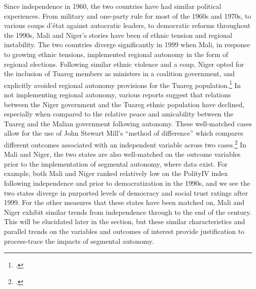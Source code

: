\documentclass[12pt]{article}
\begin{document}
Since independence in 1960, the two countries have had similar political experiences. From military and one-party rule for most of the 1960s and 1970s, to various coups d’état against autocratic leaders, to democratic reforms throughout the 1990s, Mali and Niger's stories have been of ethnic tension and regional instability. The two countries diverge significantly in 1999 when Mali, in response to growing ethnic tensions, implemented regional autonomy in the form of regional elections. Following similar ethnic violence and a coup, Niger opted for the inclusion of Tuareg members as ministers in a coalition government, and explicitly avoided regional autonomy provisions for the Tuareg population.\footcite{minorities_at_risk_project_minorities_2009} In not implementing regional autonomy, various reports suggest that relations between the Niger government and the Tuareg ethnic population have declined, especially when compared to the relative peace and amicability between the Tuareg and the Malian government following autonomy. These well-matched cases allow for the use of John Stewart Mill's ``method of difference'' which compares different outcomes associated with an independent variable across two cases.\footcite{mill_system_2002} In Mali and Niger, the two states are also well-matched on the outcome variables prior to the implementation of segmental autonomy, where data exist. For example, both Mali and Niger ranked relatively low on the PolityIV index following independence and prior to democratization in the 1990s, and we see the two states diverge in purported levels of democracy and social trust ratings after 1999. For the other measures that these states have been matched on, Mali and Niger exhibit similar trends from independence through to the end of the century. This will be elucidated later in the section, but these similar characteristics and parallel trends on the variables and outcomes of interest provide justification to process-trace the impacts of segmental autonomy. 
\end{document}

